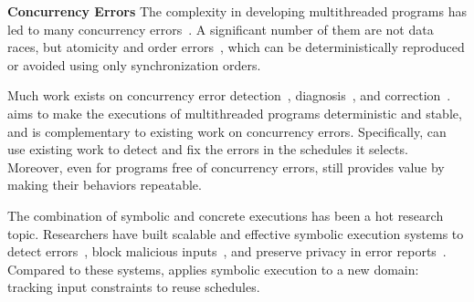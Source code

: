\noindent
{\bf Concurrency Errors} The complexity in developing multithreaded
programs has led to many concurrency errors~\cite{lu:concurrency-bugs}.  A
significant number of them are not data races, but atomicity and order
errors~\cite{lu:concurrency-bugs}, which can be deterministically
reproduced or avoided using only synchronization orders.

Much work exists on concurrency error
detection~\cite{yu:racetrack:sosp,savage:eraser,racerx:sosp03,lu:muvi:sosp,
avio:asplos06,conmem:asplos10},
diagnosis~\cite{racefuzzer:pldi08,ctrigger:asplos09,atomfuzzer:fse08}, and
correction~\cite{dimmunix:osdi08,gadara:osdi08}.  \tern aims to make the
executions of multithreaded programs deterministic and stable, and is
complementary to existing work on concurrency errors.  Specifically,
\tern can use existing work to detect and fix the errors in the schedules
it selects.  Moreover, even for programs free of concurrency errors,
\tern still provides value by making their behaviors repeatable.

 The combination of symbolic and
concrete executions has been a hot research topic.  Researchers have built
scalable and effective symbolic execution systems to detect
errors~\cite{dart:pldi,cute:fse,godefroid:grammar-fuzzing,
godefroid:whitebox-fuzzing,klee:osdi08,yang:malicious-disk:oakland06,
cadar:exe:ccs06,s2e:hotdep09,taas:socc10},
block malicious inputs~\cite{castro:bouncer}, and preserve privacy in
error reports~\cite{castro:bug-report-privacy}.  Compared to these
systems, \tern applies symbolic execution to a new domain: tracking input
constraints to reuse schedules.
